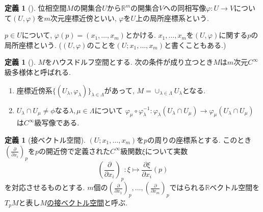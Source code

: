 \documentclass[dvipdfmx,a4paper,11pt]{article}
\newcommand{\R}{\mathbb{R}}
\theoremstyle{definition}
\newtheorem{dfn}[thm]{定義}
\newcommand{\pdrv}[2]{\frac{\partial #1}{\partial #2}}
\begin{document}
\begin{tcolorbox}[
    colback = white,
    colframe = green!35!black,
    fonttitle = \bfseries,
    breakable = true]
    \begin{dfn}[]
    \label{defn_local}
    位相空間$M$の開集合$U$から$\R^m$の開集合$V$への同相写像$\varphi : U \rightarrow V$について$(U, \varphi)$を$m$次元座標近傍といい, $\varphi$を$U$上の局所座標系という. 
    
    $p \in U$について, $\varphi(p) =(x_1, \ldots, x_m)$とかける. $x_1, \ldots, x_m$を$(U, \varphi)$に関する$p$の局所座標という. ($(U, \varphi)$のことを$(U; x_1, \ldots, x_m)$と書くこともある.) 
    \end{dfn}
    
    \end{tcolorbox}
    \begin{tcolorbox}[
    colback = white,
    colframe = green!35!black,
    fonttitle = \bfseries,
    breakable = true]
    \begin{dfn}[]
    $M$をハウスドルフ空間とする. 次の条件が成り立つとき$M$は$m$次元$C^{\infty}$級多様体と呼ばれる.
     \begin{enumerate}
     \setlength{\parskip}{0cm}
  \setlength{\itemsep}{0pt} 
     \item 座標近傍系$\{(U_\lambda, \varphi_\lambda)\}_{\lambda \in\Lambda}$があって, $M = \cup_{\lambda \in \Lambda} U_{\lambda}$となる. 
     \item $U_\lambda \cap U_\mu \neq \phi$なる$\lambda, \mu \in \Lambda$について
    $
   \varphi_\mu\circ \varphi_{\lambda}^{-1} : \varphi_{\lambda}(U_\lambda \cap U_\mu) \rightarrow \varphi_{\mu}(U_\lambda \cap U_\mu) 
    $
    は$C^{\infty}$級写像である. 
     \end{enumerate}
    \end{dfn}
    \end{tcolorbox}    

\begin{tcolorbox}[
    colback = white,
    colframe = green!35!black,
    fonttitle = \bfseries,
    breakable = true]
    \begin{dfn}[接ベクトル空間]
 $(U; x_1, \ldots, x_m)$を$p$の周りの座標系とする. このとき$(\pdrv{}{x_i})_{p}$を$p$の開近傍で定義された$C^{\infty}$級関数$\xi$について実数
     $$
   \left(\pdrv{}{x_i}\right)_{p} :   \xi \mapsto \pdrv{\xi}{x_i}(p)
     $$
     を対応させるものとする. $m$個の$(\pdrv{}{x_1})_{p}, \ldots, (\pdrv{}{x_m})_{p}$ではられる$\R$ベクトル空間を$T_{p}M$と表し\underline{$M$の接ベクトル空間}と呼ぶ. 
    \end{dfn}
    \end{tcolorbox}    
    
\end{document}
